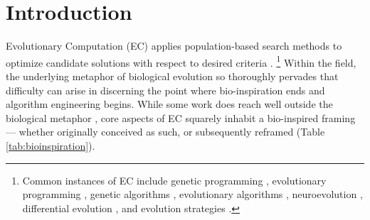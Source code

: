 %

\section{Introduction} \label{sec:introduction}

Evolutionary Computation (EC) applies population-based search methods to optimize candidate solutions with respect to desired criteria \citep{fogel1999evolutionary}.
\unskip\footnote{%
Common instances of EC include genetic programming \citep{koza1992genetic}, evolutionary programming \citep{fogel1966artificial}, genetic algorithms \citep{mitchell1996introduction}, evolutionary algorithms \citep{holland1975adaptation}, neuroevolution \citep{stanley2002evolving}, differential evolution \citep{storn1997differential}, and evolution strategies \citep{rechenberg1973evolutionsstrategie}.
}
Within the field, the underlying metaphor of biological evolution so thoroughly pervades that difficulty can arise in discerning the point where bio-inspiration ends and algorithm engineering begins.
While some work does reach well outside the biological metaphor \citep{hansen2001completely,munteanu1999improving,miller2015cartesian}, core aspects of EC squarely inhabit a bio-inspired framing --- whether originally conceived as such, or subsequently reframed (Table \ref{tab:bioinspiration}).



